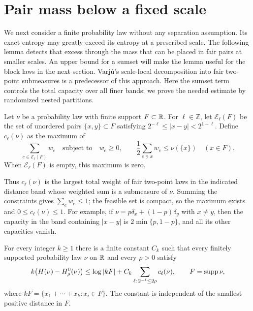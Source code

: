 \section{Pair mass below a fixed scale}\label{sec:pairs}

We next consider a finite probability law without any separation assumption.
Its exact entropy may greatly exceed its entropy at a prescribed scale.
The following lemma detects that excess through the mass that can be
placed in fair pairs at smaller scales.  An upper bound for a sumset
will make the lemma useful for the block laws in the next section.
Varj\'u's scale-local decomposition into fair two-point submeasures
\cite[Proposition~21]{VarjuAbsolute2019} is a predecessor of this approach.
Here the sumset term controls the total capacity over all finer bands;
we prove the needed estimate by randomized nested partitions.

\begin{definition}\label{def:pair-capacity}
Let $\nu$ be a probability law with finite support $F\subset\mathbb R$.
For $\ell\in\mathbb Z$, let $\mathcal E_\ell(F)$ be the set of
unordered pairs $\{x,y\}\subset F$ satisfying
$2^{-\ell}\le |x-y|<2^{1-\ell}$.
Define $c_\ell(\nu)$ as the maximum of
\[
 \sum_{e\in\mathcal E_\ell(F)}w_e
 \quad\text{subject to}\quad
 w_e\ge0,\qquad
 \frac12\sum_{e\ni x}w_e\le\nu(\{x\})\quad(x\in F).
\]
When $\mathcal E_\ell(F)$ is empty, this maximum is zero.
\end{definition}

Thus $c_\ell(\nu)$ is the largest total weight of fair two-point laws
in the indicated distance band whose weighted sum is a submeasure of
$\nu$.  Summing the constraints gives $\sum_e w_e\le1$; the feasible
set is compact, so the maximum exists and $0\le c_\ell(\nu)\le1$.
For example, if $\nu=p\delta_x+(1-p)\delta_y$ with $x\ne y$, then
the capacity in the band containing $|x-y|$ is $2\min\{p,1-p\}$,
and all its other capacities vanish.

\begin{lemma}\label{lem:pair-bound}
For every integer $k\ge1$ there is a finite constant $C_k$ such that
every finitely supported probability law $\nu$ on $\mathbb R$ and every
$\rho>0$ satisfy
\begin{equation}\label{eq:pair-bound}
 k\bigl(H(\nu)-H^0_\rho(\nu)\bigr)
 \le \log|kF|
   +C_k\sum_{\ell:\,2^{-\ell}\le2\rho}c_\ell(\nu),
 \qquad F=\operatorname{supp}\nu,
\end{equation}
where $kF=\{x_1+\cdots+x_k:x_i\in F\}$.
The constant is independent of the smallest positive distance in $F$.
\end{lemma}

